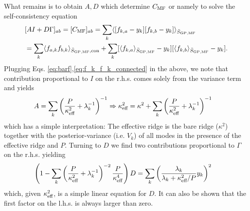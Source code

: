 What remains is to obtain $A,D$ which determine $C_{\text{MF}}$ or namely to solve the self-consistency equation
\begin{align}
&[AI+D\Gamma]_{ab} = [C_{\text{MF}}]_{ab} = \sum_k \langle [f_{k,a}-y_k][f_{k,b}-y_k] \rangle_{\bar{S}_{\text{GP},\text{MF}}} \\ \nonumber 
&= \sum_k \langle f_{a,k} f_{b,k} \rangle_{\bar{S}_{\text{GP},\text{MF}},\text{con}} 
+ \sum_k [\langle f_{k,a}\rangle_{\bar{S}_{\text{GP},\text{MF}}}-y_k][\langle f_{k,b}\rangle_{\bar{S}_{\text{GP},\text{MF}}}-y_k]. 
\end{align}
Plugging Eqs. \ref{eq:barf},\ref{eq:f_k_f_k_connected} in the above, we note that contribution proportional to $I$ on the r.h.s. comes solely from the variance term and yields 
\begin{align}
\label{Eq:CanatarEffectiveRidge}
A &= \sum_k \left(\frac{P} {\kappa^{2}_{\text{eff}}}+\lambda_k^{-1}\right)^{-1} \Rightarrow \kappa_{\text{eff}}^2 =  \kappa^2 + \sum_k \left(\frac{P} {\kappa^{2}_{\text{eff}}}+\lambda_k^{-1}\right)^{-1}
\end{align}
which has a simple interpretation: The effective ridge is the bare ridge ($\kappa^2$) together with the posterior-variance (i.e. $V_k$) of all modes in the presence of the effective ridge and $P$. Turning to $D$ we find two contributions proportional to $\Gamma$ on the r.h.s. yielding 
\begin{align}
\label{Eq:D}
\left(1-\sum_k \left( \frac{P}{\kappa_{\text{eff}}^2} + \lambda_k^{-1} \right)^{-2}\frac{P}{\kappa^{4}_{\text{eff}}} \right)D &= \sum_k \left(\frac{\lambda_k}{\lambda_k+\kappa^2_{\text{eff}}/P} y_k\right)^2
\end{align}
which, given $\kappa^2_{\text{eff}}$, is a simple linear equation for $D$. It can also be shown that the first factor on the l.h.s. is always larger than zero.


